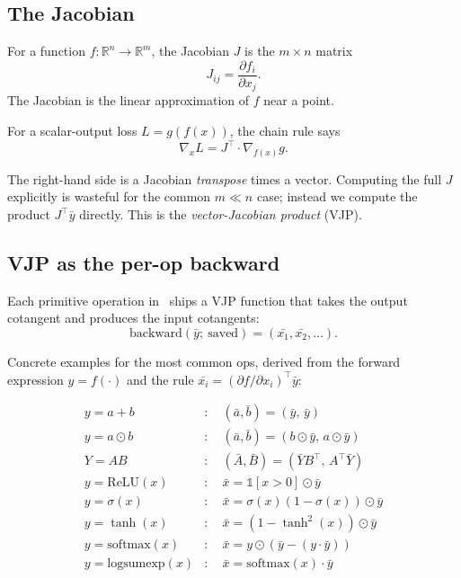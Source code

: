 \subsection{The Jacobian}
\label{ssec:ad_theory:jacobian}

For a function $f : \mathbb{R}^n \to \mathbb{R}^m$, the Jacobian
$J$ is the $m \times n$ matrix
\[
J_{ij} = \frac{\partial f_i}{\partial x_j}.
\]
The Jacobian is the linear approximation of $f$ near a point.

For a scalar-output loss $L = g(f(x))$, the chain rule says
\[
\nabla_x L = J^\top \cdot \nabla_{f(x)} g.
\]

The right-hand side is a Jacobian \emph{transpose} times a
vector. Computing the full $J$ explicitly is wasteful for the
common $m \ll n$ case; instead we compute the product $J^\top
\bar{y}$ directly. This is the \emph{vector-Jacobian product}
(VJP).

\subsection{VJP as the per-op backward}
\label{ssec:ad_theory:vjp_per_op}

Each primitive operation in \Lucid\ ships a VJP function that
takes the output cotangent and produces the input cotangents:
\[
\text{backward}(\bar{y};\ \text{saved}) = (\bar{x_1}, \bar{x_2},
\ldots).
\]

Concrete examples for the most common ops, derived from the
forward expression $y = f(\cdot)$ and the rule $\bar{x_i} =
(\partial f / \partial x_i)^\top \bar{y}$:

\begin{align*}
y = a + b              &: \quad (\bar{a}, \bar{b}) = (\bar{y},\, \bar{y}) \\
y = a \odot b          &: \quad (\bar{a}, \bar{b}) = (b \odot \bar{y},\, a \odot \bar{y}) \\
Y = A B                &: \quad (\bar{A}, \bar{B}) = (\bar{Y} B^\top,\, A^\top \bar{Y}) \\
y = \mathrm{ReLU}(x)   &: \quad \bar{x} = \mathbb{1}[x > 0] \odot \bar{y} \\
y = \sigma(x)          &: \quad \bar{x} = \sigma(x)(1-\sigma(x)) \odot \bar{y} \\
y = \tanh(x)           &: \quad \bar{x} = (1 - \tanh^2(x)) \odot \bar{y} \\
y = \mathrm{softmax}(x)&: \quad \bar{x} = y \odot (\bar{y} - (y \cdot \bar{y})) \\
y = \mathrm{logsumexp}(x) &: \quad \bar{x} = \mathrm{softmax}(x) \cdot \bar{y}
\end{align*}

